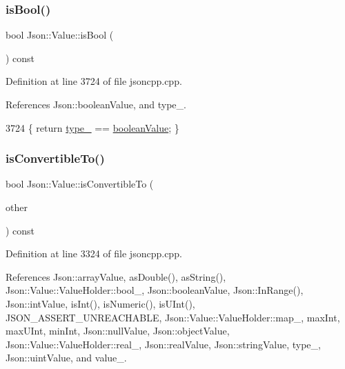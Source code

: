 \subsubsection{\texorpdfstring{is\+Bool()}{isBool()}}
{\footnotesize\ttfamily bool Json\+::\+Value\+::is\+Bool (\begin{DoxyParamCaption}{ }\end{DoxyParamCaption}) const}



Definition at line 3724 of file jsoncpp.\+cpp.



References Json\+::boolean\+Value, and type\+\_\+.


\begin{DoxyCode}
3724 \{ \textcolor{keywordflow}{return} \hyperlink{class_json_1_1_value_abd222c2536dc88bf330dedcd076d2356}{type\_} == \hyperlink{namespace_json_a7d654b75c16a57007925868e38212b4ea14c30dbf4da86f7b809be299f671f7fd}{booleanValue}; \}
\end{DoxyCode}
\mbox{\label{class_json_1_1_value_af1ee6be27a96a7d12128efdd60deb54d}} 
\subsubsection{\texorpdfstring{is\+Convertible\+To()}{isConvertibleTo()}}
{\footnotesize\ttfamily bool Json\+::\+Value\+::is\+Convertible\+To (\begin{DoxyParamCaption}\item[{\hyperlink{namespace_json_a7d654b75c16a57007925868e38212b4e}{Value\+Type}}]{other }\end{DoxyParamCaption}) const}



Definition at line 3324 of file jsoncpp.\+cpp.



References Json\+::array\+Value, as\+Double(), as\+String(), Json\+::\+Value\+::\+Value\+Holder\+::bool\+\_\+, Json\+::boolean\+Value, Json\+::\+In\+Range(), Json\+::int\+Value, is\+Int(), is\+Numeric(), is\+U\+Int(), J\+S\+O\+N\+\_\+\+A\+S\+S\+E\+R\+T\+\_\+\+U\+N\+R\+E\+A\+C\+H\+A\+B\+LE, Json\+::\+Value\+::\+Value\+Holder\+::map\+\_\+, max\+Int, max\+U\+Int, min\+Int, Json\+::null\+Value, Json\+::object\+Value, Json\+::\+Value\+::\+Value\+Holder\+::real\+\_\+, Json\+::real\+Value, Json\+::string\+Value, type\+\_\+, Json\+::uint\+Value, and value\+\_\+.


